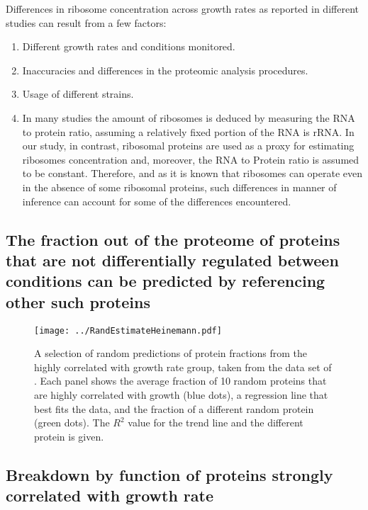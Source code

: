 \documentclass{article}
\begin{document}
Differences in ribosome concentration  across growth rates as reported in different studies can result from a few factors:
\begin{enumerate}
\item Different growth rates and conditions monitored.
\item Inaccuracies and differences in the proteomic analysis procedures.
\item Usage of different strains.
\item In many studies the amount of ribosomes is deduced by measuring the RNA to protein ratio, assuming a relatively fixed portion of the RNA is rRNA.
In our study, in contrast, ribosomal proteins are used as a proxy for estimating ribosomes concentration and, moreover, the RNA to Protein ratio is assumed to be constant.
Therefore, and as it is known that ribosomes can operate even in the absence of some ribosomal proteins, such differences in manner of inference can account for some of the differences encountered.
\end{enumerate}

\subsection{The fraction out of the proteome of proteins that are not differentially regulated between conditions can be predicted by referencing other such proteins}

\begin{figure}[H]
\begin{center}
\texttt{[image: ../RandEstimateHeinemann.pdf]}
\caption{\label{fig:randpred}
  A selection of random predictions of protein fractions from the highly correlated with growth rate group, taken from the data set of \cite{Heinemann2015}.
  Each panel shows the average fraction of 10 random proteins that are highly correlated with growth (blue dots), a regression line that best fits the data, and the fraction of a different random protein (green dots).
  The $R^2$ value for the trend line and the different protein is given.
%
}
\end{center}
\end{figure}

\subsection{Breakdown by function of proteins strongly correlated with growth rate}

\begin{table}[H]
\centering
{}
\caption{\label{tab:corrbreakdownh}
Breakdown by function of strongly positively correlated with growth rate proteins in the data set from \cite{Heinemann2015}%
}
\end{table}
\end{document}
